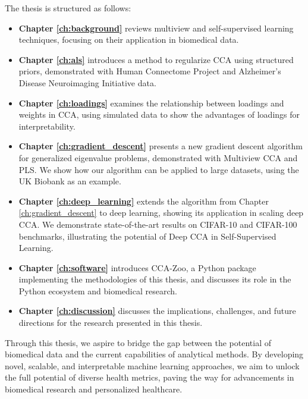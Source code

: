 The thesis is structured as follows:
\begin{itemize}
    \item \textbf{Chapter \ref{ch:background}} reviews multiview and self-supervised learning techniques, focusing on their application in biomedical data.
    \item \textbf{Chapter \ref{ch:als}} introduces a method to regularize CCA using structured priors, demonstrated with Human Connectome Project and Alzheimer's Disease Neuroimaging Initiative data.
    \item \textbf{Chapter \ref{ch:loadings}} examines the relationship between loadings and weights in CCA, using simulated data to show the advantages of loadings for interpretability.
    \item \textbf{Chapter \ref{ch:gradient_descent}} presents a new gradient descent algorithm for generalized eigenvalue problems, demonstrated with Multiview CCA and PLS. We show how our algorithm can be applied to large datasets, using the UK Biobank as an example.
    \item \textbf{Chapter \ref{ch:deep_learning}} extends the algorithm from Chapter \ref{ch:gradient_descent} to deep learning, showing its application in scaling deep CCA. We demonstrate state-of-the-art results on CIFAR-10 and CIFAR-100 benchmarks, illustrating the potential of Deep CCA in Self-Supervised Learning.
    \item \textbf{Chapter \ref{ch:software}} introduces CCA-Zoo, a Python package implementing the methodologies of this thesis, and discusses its role in the Python ecosystem and biomedical research.
    \item \textbf{Chapter \ref{ch:discussion}} discusses the implications, challenges, and future directions for the research presented in this thesis.
\end{itemize}

Through this thesis, we aspire to bridge the gap between the potential of biomedical data and the current capabilities of analytical methods. By developing novel, scalable, and interpretable machine learning approaches, we aim to unlock the full potential of diverse health metrics, paving the way for advancements in biomedical research and personalized healthcare.